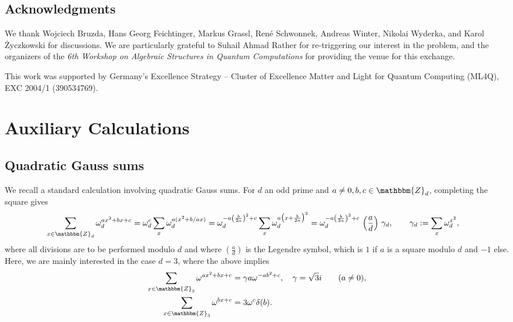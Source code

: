 \documentclass[aps,nofootinbib,floatfix,a4paper]{revtex4}
\newcommand{\1}{\mbox{$\mathbf{1}$}}
\def\ZZ{\mathbbm{Z}}
\begin{document}
\subsection{Acknowledgments}

We thank 
Wojciech Bruzda,
Hans Georg Feichtinger,
Markus Grassl,
Ren\'e Schwonnek,
Andreas Winter, 
Nikolai Wyderka,
and
Karol {\.Z}yczkowski
for discussions.
We are particularly grateful to Suhail Ahmad Rather
for re-triggering our interest in the problem,
and the organizers of the
\emph{6th Workshop on Algebraic Structures in Quantum Computations}
for providing the venue for this exchange.

This work was supported by
Germany's Excellence Strategy -- Cluster of Excellence Matter and Light for Quantum Computing (ML4Q), EXC 2004/1 (390534769).






\appendix


\section{Auxiliary Calculations}

\subsection{Quadratic Gauss sums}
\label{sec:gauss}

We recall a standard calculation involving quadratic Gauss sums.
For $d$ an odd prime and $a\neq 0,b,c\in\ZZ_d$,
completing the square gives
\begin{align*}
	\sum_{x\in\ZZ_d} \omega_d^{a x^2+bx+c} 
	&=
	\omega_d^{c}
	\sum_x \omega_d^{a(x^2+b/a x)} 
	=
	\omega_d^{-a\left(\frac{b}{2a}\right)^2+c}
	\sum_x \omega_d^{a\big(x+\frac{b}{2a}\big)^2} 
	=
	\omega_d^{-a\left(\frac{b}{2a}\right)^2+c}
	\,
	\left(\frac{a}d\right)
	\,
	\gamma_d,
	\qquad
	\gamma_d
	:=
	\sum_{x} \omega_d^{x^2},
\end{align*}
where all divisions are to be performed modulo $d$ and where 
$\left(\frac{a}d\right)$
is the Legendre symbol, which is $1$ if $a$ is a square modulo $d$ and $-1$ else.
Here, we are mainly interested in the case $d=3$, where the 
above implies
\begin{align}
	\begin{split} \label{eqn:gauss_sum_3}
		\sum_{x\in\ZZ_3} \omega^{a x^2+bx+c} 
		&=
		\gamma
		a
		\omega^{-ab^2+c},
		\quad
		\gamma
		=
		\sqrt 3 i
		\qquad(a\neq 0), \\
		\sum_{x\in\ZZ_3} \omega^{bx+c} 
		&=
		3 \omega^c \delta(b).
	\end{split}
\end{align}
\end{document}
